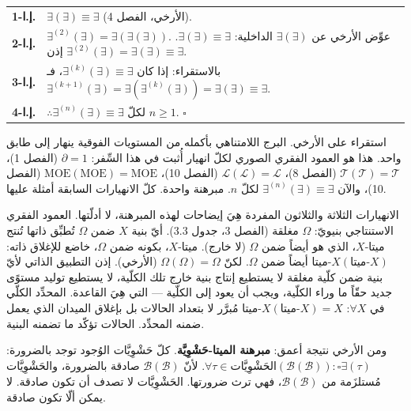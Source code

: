 \documentclass[10pt, openany, oneside]{book}
\renewcommand{\footnotesize}{\fontsize{8.5}{11}\selectfont}
\begin{document}
\vspace{0.5em}

{\footnotesize
\noindent\begin{tabular}{r p{}}
\textbf{إ.ا-1.} & $\exists(\exists) \equiv \exists$ (الأرخي، الفصل 4). \\[0.3em]
\textbf{إ.ا-2.} & $\exists^{(2)}(\exists) = \exists(\exists(\exists))$. عوِّض الأرخي عن $\exists(\exists)$ الداخلية: $\exists(\exists) \equiv \exists$. إذن $\exists^{(2)}(\exists) = \exists(\exists) \equiv \exists$. \\[0.3em]
\textbf{إ.ا-3.} & بالاستقراء: إذا كان $\exists^{(k)}(\exists) \equiv \exists$، فـ$\exists^{(k+1)}(\exists) = \exists(\exists^{(k)}(\exists)) = \exists(\exists) \equiv \exists$. \\[0.3em]
\textbf{إ.ا-4.} & $\therefore \exists^{(n)}(\exists) \equiv \exists$ لكلّ $n \geq 1$. $\square$ \\[0.3em]
\end{tabular}
}

\vspace{0.8em}

\noindent استقراء على الأرخي. البرج اللامتناهي بأكمله من المستويات الفوقية ينهار إلى طابق واحد. هذا هو العمود الفقري الصوري لكلّ انهيار أُثبت في هذا السِّفر: $\partial = 1$ (الفصل 1)، $\mathcal{T}(\mathcal{T}) = \mathcal{T}$ (الفصل 8)، $\mathcal{L}(\mathcal{L}) = \mathcal{L}$ (الفصل 10)، $\text{MOE}(\text{MOE}) = \text{MOE}$ (الفصل 10)، والآن $\exists^{(n)}(\exists) \equiv \exists$ لكلّ $n$. مبرهنة واحدة. كلّ الانهيارات السابقة أمثلة عليها.

الانهيارات الثلاثة والثلاثون المفردة هِيَ إيضاحات لهذه المبرهنة، لا أدلّتها. العمود الفقري الاستنتاجي بنيويّ: $\Omega$ مغلقة (الفصل 3، جدول 3.3). أيّ بنية $X$ ضمن $\Omega$ تُطبِّق ذاتها تُنتج ميتا-$X$، الذي هو أيضاً ضمن $\Omega$ (لا خارج). ميتا-$X$، بكونه ضمن $\Omega$، خاضع للإغلاق ذاته: $\text{ميتا-}X(\text{ميتا-}X)$ أيضاً ضمن $\Omega$. لكنّ $\Omega(\Omega) = \Omega$ (الأرخي). إذن التطبيق الذاتي لأيّ بنية ضمن كلّية مغلقة لا يستطيع إنتاج بنية خارج تلك الكلّية، لا يستطيع توليد مستوًى جديد حقّاً ما وراء الكلّية، ويجب أن يعود إلى الكلّية --- التي هِيَ القاعدة. المحدِّد الكلّي في $\forall X$: $\text{ميتا-}X(\text{ميتا-}X) = X$ مُبرَّر لا بتعداد الحالات بل بإغلاق الميدان الذي يعمل ضمنه المحدِّد. الحالات تؤكّد ما تضمنه البنية.

ومن الأرخي نتيجة أعمق: \textbf{مبرهنة الميتا-حَشْوِيَّة}. كلّ حَشْوِيَّات الوُجود توجد بالضرورة: $\forall \tau \in \text{الحَشْوِيَّات}(\mathcal{B}(\mathcal{B})): \square\exists(\tau)$. لأنّ $\mathcal{B}(\mathcal{B})$ صادقة بالضرورة، والحَشْوِيَّات مُستلزَمة من $\mathcal{B}(\mathcal{B})$، فهي ترث ضرورتها. الحَشْوِيَّات لا تصدف أن تكون صادقة. لا يمكن ألّا تكون صادقة.
\end{document}

